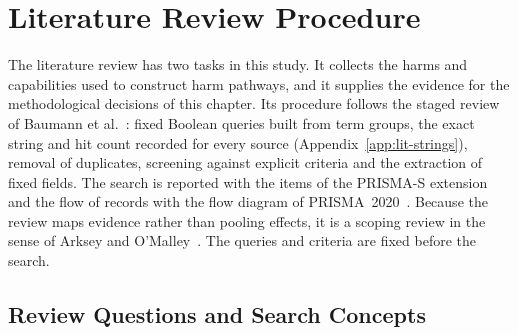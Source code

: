 \section{Literature Review Procedure}
\label{sec:lit-review}
The literature review has two tasks in this study. It collects the harms and capabilities used
to construct harm pathways, and it supplies the evidence for the methodological decisions of
this chapter. Its procedure follows the staged review of Baumann et
al.~\parencite{baumann2025llm}: fixed Boolean queries built from term groups, the exact string
and hit count recorded for every source (Appendix~\ref{app:lit-strings}), removal of
duplicates, screening against explicit criteria and the extraction of fixed fields. The search is reported with the items of the
PRISMA-S extension and the flow of records with the flow diagram of
PRISMA~2020~\parencite{rethlefsen2021prisma,page2021prisma}. Because the review maps evidence
rather than pooling effects, it is a scoping review in the sense of Arksey and
O'Malley~\parencite{arksey2005scoping}. The queries and criteria are fixed before the search.
\highlight[orange!25]{\textbf{[?]}}

\subsection{Review Questions and Search Concepts}
\label{sec:lit-search}
